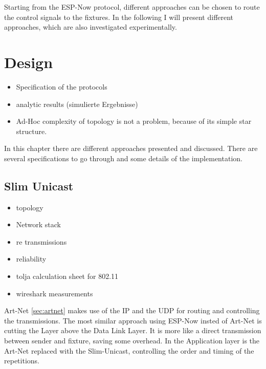 \documentclass[]{ccs-thesis}
\begin{document}
Starting from the ESP-Now protocol, different approaches can be chosen to route the control signals to the fixtures. 
In the following I will present different approaches, which are also investigated experimentally.

\section{Design}
\label{sec:design}
\begin{itemize}
	\item Specification of the protocols
	\item analytic results (simulierte Ergebnisse)
	\item Ad-Hoc complexity of topology is not a problem, because of its simple star structure.
\end{itemize}

In this chapter there are different approaches presented and discussed.
There are several specifications to go through and some details of the implementation.

\subsection{Slim Unicast}
\begin{itemize}
\item topology
\item Network stack
\item re transmissions
\item reliability
\item tolja calculation sheet for 802.11
\item wireshark measurements
\end{itemize}

Art-Net \cref{sec:artnet} makes use of the \ac{IP} and the \ac{UDP} for routing and controlling the transmissions.
The most similar approach using ESP-Now insted of Art-Net is cutting the Layer above the Data Link Layer.
It is more like a direct transmission between sender and fixture, saving some overhead.
In the Application layer is the Art-Net replaced with the Slim-Unicast, controlling the order and timing of the repetitions.
\end{document}
